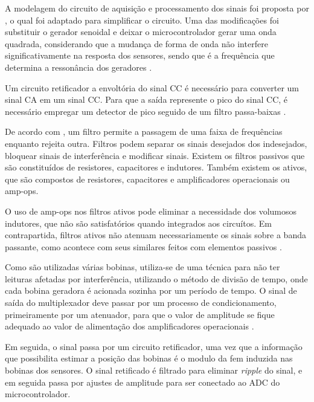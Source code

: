 A modelagem do circuito de aquisição e processamento dos sinais foi proposta por , o qual 
foi adaptado para simplificar o circuito. Uma das modificações foi substituir o gerador senoidal e deixar o microcontrolador 
gerar uma onda quadrada, considerando que a mudança de forma de onda não interfere significativamente na resposta dos sensores, 
sendo que é a frequência que determina a ressonância dos geradores \cite{RUANI}.

Um circuito retificador a envoltória do sinal CC é necessário para converter um sinal CA em um sinal CC. Para que a saída represente o pico do sinal CC, 
é necessário empregar um detector de pico seguido de um filtro passa-baixas \cite{Boylestad}.

De acordo com \cite{malvinaodamassa}, um filtro permite a passagem de uma faixa de frequências enquanto rejeita outra. Filtros 
podem separar os sinais desejados dos indesejados, bloquear sinais de interferência e modificar sinais. Existem os filtros 
passivos que são constituídos de resistores, capacitores e indutores. Também existem os ativos, que são compostos de resistores, 
capacitores e amplificadores operacionais ou amp-ops.

O uso de amp-ops nos filtros ativos pode eliminar a necessidade dos volumosos indutores, que não são satisfatórios quando 
integrados aos circuítos. Em contrapartida, filtros ativos não atenuam necessariamente os sinais sobre a banda passante, como acontece 
com seus similares feitos com elementos passivos \cite{Cathey}.

Como são utilizadas várias bobinas, utiliza-se de uma técnica para não ter leituras afetadas por interferência, utilizando o 
método de divisão de tempo, onde cada bobina geradora é acionada sozinha por um período de tempo. O sinal de saída do 
multiplexador deve passar por um processo de condicionamento, primeiramente por um atenuador, para que o valor de amplitude se
fique adequado ao valor de alimentação dos amplificadores operacionais \cite{RUANI}.

Em seguida, o sinal passa por um circuito retificador, uma vez que a informação que possibilita estimar a posição das bobinas é 
o modulo da fem induzida nas bobinas dos sensores. O sinal retificado é filtrado para eliminar \textit{ripple} do sinal, e em 
seguida passa por ajustes de amplitude para ser conectado ao ADC do microcontrolador.
	

	
	
	
	
	
	